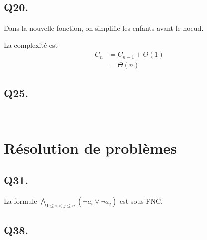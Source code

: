     \subsection*{Q20.}
    Dans la nouvelle fonction, on simplifie les enfants avant le noeud.

    La complexité est
    \begin{align*}
        C_n &= C_{n-1} + \Theta(1)\\
        &= \Theta(n)
    \end{align*}

    \subsection*{Q25.}~

    \section{Résolution de problèmes}
    \subsection*{Q31.}
    La formule $\bigwedge\limits_{1 \leq i < j \leq n}(\lnot a_i \vee \lnot a_j)$ est sous FNC.

    \subsection*{Q38.}~

